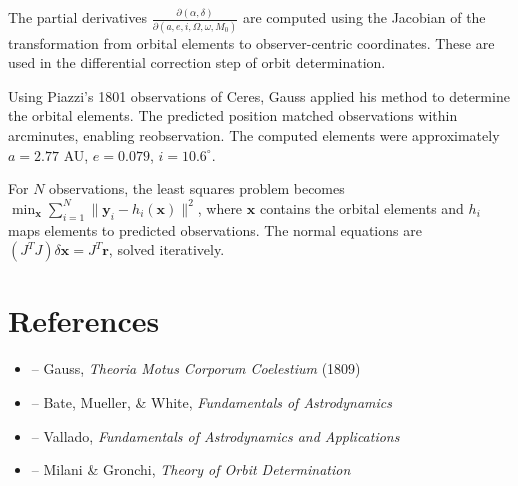 \begin{solution}
The partial derivatives $\frac{\partial(\alpha, \delta)}{\partial(a, e, i, \Omega, \omega, M_0)}$ are computed using the Jacobian of the transformation from orbital elements to observer-centric coordinates. These are used in the differential correction step of orbit determination.
\end{solution}

\begin{solution}
Using Piazzi's 1801 observations of Ceres, Gauss applied his method to determine the orbital elements. The predicted position matched observations within arcminutes, enabling reobservation. The computed elements were approximately $a = 2.77$ AU, $e = 0.079$, $i = 10.6^\circ$.
\end{solution}

\begin{solution}
For $N$ observations, the least squares problem becomes $\min_{\mathbf{x}} \sum_{i=1}^N \| \mathbf{y}_i - h_i(\mathbf{x}) \|^2$, where $\mathbf{x}$ contains the orbital elements and $h_i$ maps elements to predicted observations. The normal equations are $(J^T J) \delta\mathbf{x} = J^T \mathbf{r}$, solved iteratively.
\end{solution}

\section{References}

\begin{itemize}
    \item \cite{gauss-theoria} -- Gauss, \textit{Theoria Motus Corporum Coelestium} (1809)
    \item \cite{bate-mueller-white} -- Bate, Mueller, \& White, \textit{Fundamentals of Astrodynamics}
    \item \cite{vallado} -- Vallado, \textit{Fundamentals of Astrodynamics and Applications}
    \item \cite{milani-gronchi} -- Milani \& Gronchi, \textit{Theory of Orbit Determination}
\end{itemize}